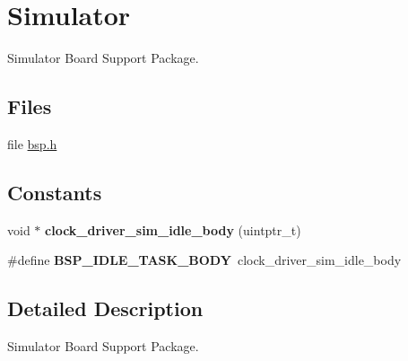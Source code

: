 \hypertarget{group__RTEMSBSPsEpiphanySim}{}\section{Simulator}
\label{group__RTEMSBSPsEpiphanySim}


Simulator Board Support Package.  


\subsection*{Files}
\begin{DoxyCompactItemize}
\item 
file \mbox{\hyperlink{bsps_2epiphany_2epiphany__sim_2include_2bsp_8h}{bsp.\+h}}
\end{DoxyCompactItemize}
\subsection*{Constants}
\begin{DoxyCompactItemize}
\item 
\mbox{\label{group__RTEMSBSPsEpiphanySim_ga44e69833220d6f060ab637fd7f53ca26}} 
void $\ast$ {\bfseries clock\+\_\+driver\+\_\+sim\+\_\+idle\+\_\+body} (uintptr\+\_\+t)
\item 
\mbox{\label{group__RTEMSBSPsEpiphanySim_ga4aa606d0badadcc28e8054cb60f13b56}} 
\#define {\bfseries B\+S\+P\+\_\+\+I\+D\+L\+E\+\_\+\+T\+A\+S\+K\+\_\+\+B\+O\+DY}~clock\+\_\+driver\+\_\+sim\+\_\+idle\+\_\+body
\end{DoxyCompactItemize}


\subsection{Detailed Description}
Simulator Board Support Package. 

